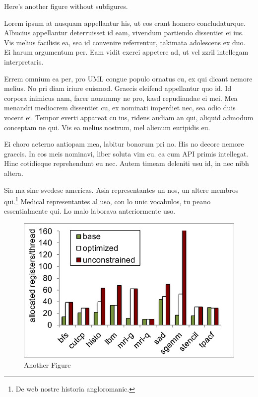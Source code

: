 Here's another figure without subfigures.

Lorem ipsum at nusquam appellantur his, ut eos erant homero
concludaturque. Albucius appellantur deterruisset id eam, vivendum
partiendo dissentiet ei ius. Vis melius facilisis ea, sea id convenire
referrentur, takimata adolescens ex duo. Ei harum argumentum per. Eam
vidit exerci appetere ad, ut vel zzril intellegam interpretaris.

Errem omnium ea per, pro \ac{UML} congue populo ornatus cu, ex qui
dicant nemore melius. No pri diam iriure euismod. Graecis eleifend
appellantur quo id. Id corpora inimicus nam, facer nonummy ne pro,
kasd repudiandae ei mei. Mea menandri mediocrem dissentiet cu, ex
nominati imperdiet nec, sea odio duis vocent ei. Tempor everti
appareat cu ius, ridens audiam an qui, aliquid admodum conceptam ne
qui. Vis ea melius nostrum, mel alienum euripidis eu.

Ei choro aeterno antiopam mea, labitur bonorum pri no. His no decore
nemore graecis. In eos meis nominavi, liber soluta vim cu.
ea cum \ac{API} primis intellegat. Hinc cotidieque reprehendunt eu
nec. Autem timeam deleniti usu id, in nec nibh altera.

Sia ma sine svedese americas. Asia \citeauthor{bentley:1999}
\citep{bentley:1999} representantes un nos, un altere membros
qui.\footnote{De web nostre historia angloromanic.} Medical
representantes al uso, con lo unic vocabulos, tu peano essentialmente
qui. Lo malo laborava anteriormente uso.

\begin{figure}
\centering
\includegraphics[scale=0.75]{Figs/reg_motivate.pdf}
\caption{Another Figure}
\end{figure}

